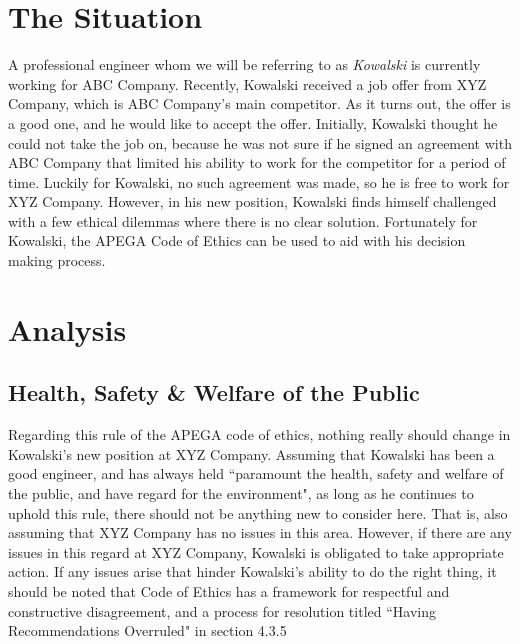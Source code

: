 \documentclass[letterpaper,12pt]{article}
\begin{document}
\section{The Situation}
A professional engineer whom we will be referring to as \textit{Kowalski} is currently working for ABC Company.
Recently, Kowalski received a job offer from XYZ Company, which is ABC Company's main competitor. As it turns out,
the offer is a good one, and he would like to accept the offer. Initially, Kowalski thought he could not take 
the job on, because he was not sure if he signed an agreement with ABC Company that limited his ability to work for the
competitor for a period of time. Luckily for Kowalski, no such agreement was made, so he is free to work for XYZ Company.
However, in his new position, Kowalski finds himself challenged with a few ethical dilemmas where there is no clear solution.
Fortunately for Kowalski, the APEGA Code of Ethics can be used to aid with his decision making process. 


\section{Analysis}

\subsection{Health, Safety \& Welfare of the Public}
Regarding this rule of the APEGA code of ethics, nothing really should change in Kowalski's new position at XYZ Company.
Assuming that Kowalski has been a good engineer, and has always held ``paramount the health, safety and welfare of the public, and have regard for the
environment"\cite{apegacode}, as long as he continues to uphold this rule, there should not be anything new to consider here. That is,
also assuming that XYZ Company has no issues in this area. However, if there are any issues in this regard at XYZ Company, Kowalski is obligated to take appropriate action.
If any issues arise that hinder Kowalski's ability to do the right thing, it should be noted that Code of Ethics has a framework for respectful and constructive disagreement, and a process for
resolution titled ``Having Recommendations Overruled" in section 4.3.5
\end{document}
